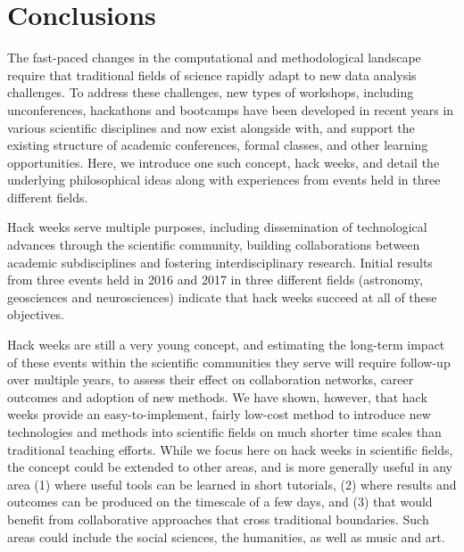 
\section*{Conclusions}

The fast-paced changes in the computational and methodological landscape require that traditional fields of science rapidly adapt to new data analysis challenges.
To address these challenges, new types of workshops, including unconferences, hackathons and bootcamps have been developed in recent years in various scientific disciplines and now exist alongside with, and support the existing structure of academic conferences, formal classes, and other learning opportunities.
Here, we introduce one such concept, hack weeks, and detail the underlying philosophical ideas along with experiences from events held in three different fields.

Hack weeks serve multiple purposes, including dissemination of technological advances through the scientific community, building collaborations between academic subdisciplines and fostering interdisciplinary research. Initial results from three events held in 2016 and 2017 in three different fields (astronomy, geosciences and neurosciences) indicate that hack weeks succeed at all of these objectives.

Hack weeks are still a very young concept, and estimating the long-term impact of these events within the scientific communities they serve will require follow-up over multiple years, to assess their effect on collaboration networks, career outcomes and adoption of new methods.
We have shown, however, that hack weeks provide an easy-to-implement, fairly low-cost method to introduce new technologies and methods into scientific fields on much shorter time scales than traditional teaching efforts.
While we focus here on hack weeks in scientific fields, the concept could be extended to other areas, and is more generally useful in any area (1) where useful tools can be learned in short tutorials, (2) where results and outcomes can be produced on the timescale of a few days, and (3) that would benefit from collaborative approaches that cross traditional boundaries. Such areas could include the social sciences, the humanities, as well as music and art.